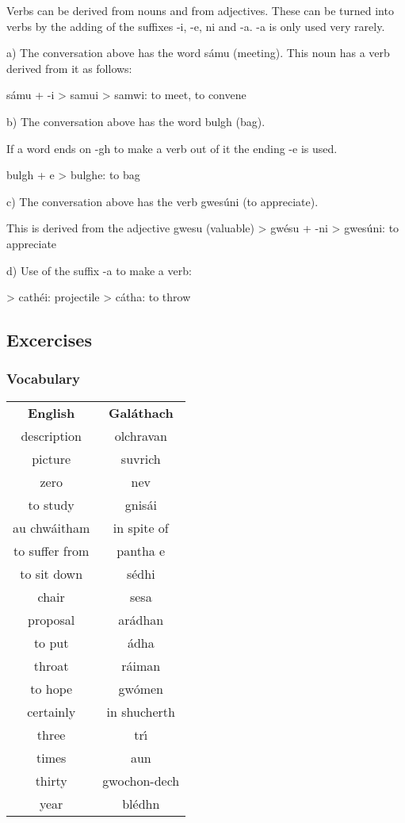 Verbs can be derived from nouns and from adjectives. These can be turned into verbs by the adding of the suffixes -i, -e, ni and -a. -a is only used very rarely.

a) The conversation above has the word s\'{a}mu (meeting).
This noun has a verb derived from it as follows:

s\'{a}mu + -i > samui > samwi: to meet, to convene

b) The conversation above has the word bulgh (bag).

If a word ends on -gh to make a verb out of it the ending -e is used.

bulgh + e > bulghe: to bag

c) The conversation above has the verb gwes\'{u}ni (to appreciate).

This is derived from the adjective gwesu (valuable)
> gw\'{e}su + -ni > gwes\'{u}ni: to appreciate

d) Use of the suffix -a to make a verb:

> cath\'{e}i: projectile
> c\'{a}tha: to throw

\subsection{Excercises}

\subsubsection{Vocabulary}

\begin{table}[H]
\centering
\begin{tabular}{cc}
  \toprule
  \textbf{English} & \textbf{Gal\'{a}thach}\\
  \cmidrule(lr){1-1}\cmidrule(lr){2-2}
  description & olchravan\\
  picture & suvrich\\
  zero & nev\\
  to study & gnis\'{a}i\\
  au chw\'{a}itham & in spite of\\
  to suffer from & pantha e\\
  to sit down & s\'{e}dhi\\
  chair & sesa\\
  proposal & ar\'{a}dhan\\
  to put & \'{a}dha\\
  throat & r\'{a}iman\\
  to hope & gw\'{o}men\\
  certainly & in shucherth\\
  three & tr\'{\i}\\
  times & aun\\
  thirty & gwochon-dech\\
  year & bl\'{e}dhn\\
  \bottomrule
\end{tabular}
\label{vocab_exercise_lesson18}
\end{table}

